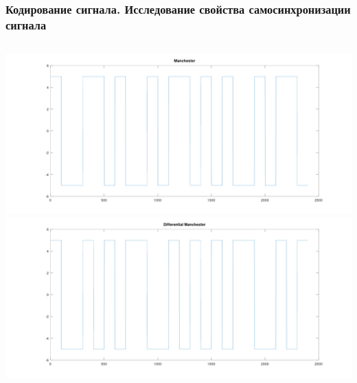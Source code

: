 \begin{frame}
\frametitle{Кодирование сигнала. Исследование свойства самосинхронизации сигнала}
\begin{columns}
            \includegraphics[width=\textwidth]{../octave/coding/signal/manchester.png}
            \includegraphics[width=\textwidth]{../octave/coding/signal/diffmanc.png}
\end{columns}
\end{frame}


